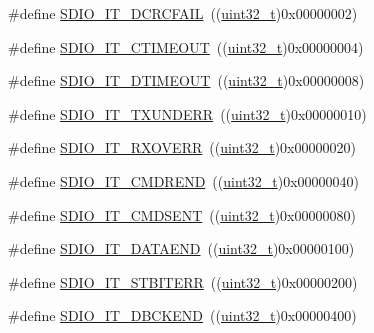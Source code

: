 \begin{DoxyCompactItemize}
\#define \hyperlink{group___s_d_i_o___interrupt__sources_gaf3321305cb4e24419185a4b92ead299a}{S\+D\+I\+O\+\_\+\+I\+T\+\_\+\+D\+C\+R\+C\+F\+A\+IL}~((\hyperlink{_p_e___types_8h_a33594304e786b158f3fb30289278f5af}{uint32\+\_\+t})0x00000002)
\item 
\#define \hyperlink{group___s_d_i_o___interrupt__sources_ga3c2fdef0993f10e65d4fddbdf71febed}{S\+D\+I\+O\+\_\+\+I\+T\+\_\+\+C\+T\+I\+M\+E\+O\+UT}~((\hyperlink{_p_e___types_8h_a33594304e786b158f3fb30289278f5af}{uint32\+\_\+t})0x00000004)
\item 
\#define \hyperlink{group___s_d_i_o___interrupt__sources_gaf5ce4bfa8459ccbe892791e5cdc26a6f}{S\+D\+I\+O\+\_\+\+I\+T\+\_\+\+D\+T\+I\+M\+E\+O\+UT}~((\hyperlink{_p_e___types_8h_a33594304e786b158f3fb30289278f5af}{uint32\+\_\+t})0x00000008)
\item 
\#define \hyperlink{group___s_d_i_o___interrupt__sources_ga93d4dbe3162b8507b2834a3e29e6c648}{S\+D\+I\+O\+\_\+\+I\+T\+\_\+\+T\+X\+U\+N\+D\+E\+RR}~((\hyperlink{_p_e___types_8h_a33594304e786b158f3fb30289278f5af}{uint32\+\_\+t})0x00000010)
\item 
\#define \hyperlink{group___s_d_i_o___interrupt__sources_ga272953292e1b43b2108b00e75db76512}{S\+D\+I\+O\+\_\+\+I\+T\+\_\+\+R\+X\+O\+V\+E\+RR}~((\hyperlink{_p_e___types_8h_a33594304e786b158f3fb30289278f5af}{uint32\+\_\+t})0x00000020)
\item 
\#define \hyperlink{group___s_d_i_o___interrupt__sources_ga6df3bb694dc00e250cd22e16a03d6910}{S\+D\+I\+O\+\_\+\+I\+T\+\_\+\+C\+M\+D\+R\+E\+ND}~((\hyperlink{_p_e___types_8h_a33594304e786b158f3fb30289278f5af}{uint32\+\_\+t})0x00000040)
\item 
\#define \hyperlink{group___s_d_i_o___interrupt__sources_gaf9d8fc4651c4b7555fb9ee4e5af6ca63}{S\+D\+I\+O\+\_\+\+I\+T\+\_\+\+C\+M\+D\+S\+E\+NT}~((\hyperlink{_p_e___types_8h_a33594304e786b158f3fb30289278f5af}{uint32\+\_\+t})0x00000080)
\item 
\#define \hyperlink{group___s_d_i_o___interrupt__sources_ga6cc1c521b64fc57b844336f7f175dd1e}{S\+D\+I\+O\+\_\+\+I\+T\+\_\+\+D\+A\+T\+A\+E\+ND}~((\hyperlink{_p_e___types_8h_a33594304e786b158f3fb30289278f5af}{uint32\+\_\+t})0x00000100)
\item 
\#define \hyperlink{group___s_d_i_o___interrupt__sources_ga55f7e65ed1b70d5a6abdc3cc41b55766}{S\+D\+I\+O\+\_\+\+I\+T\+\_\+\+S\+T\+B\+I\+T\+E\+RR}~((\hyperlink{_p_e___types_8h_a33594304e786b158f3fb30289278f5af}{uint32\+\_\+t})0x00000200)
\item 
\#define \hyperlink{group___s_d_i_o___interrupt__sources_gaa1b1fb453a3ce3b10928aaeada2b2186}{S\+D\+I\+O\+\_\+\+I\+T\+\_\+\+D\+B\+C\+K\+E\+ND}~((\hyperlink{_p_e___types_8h_a33594304e786b158f3fb30289278f5af}{uint32\+\_\+t})0x00000400)

\end{DoxyCompactItemize}
